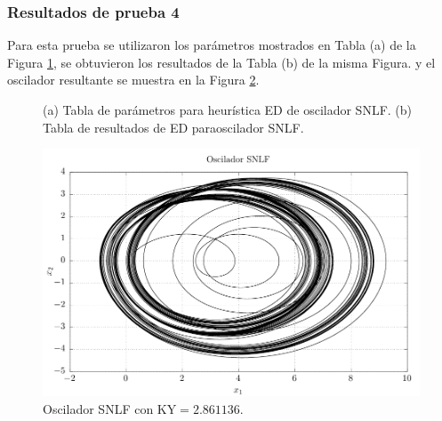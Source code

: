 \documentclass[10pt,a4paper]{article}
\begin{document}
\subsubsection{Resultados de prueba 4}
Para esta prueba se utilizaron los parámetros mostrados en Tabla (a) de la Figura \ref{fig:tabs_res4}, se obtuvieron los resultados de la Tabla (b) de la misma Figura. y el oscilador resultante se muestra en la Figura \ref{fig:res4}.
\begin{figure}[htp]
	\centering
	\hspace{2cm}
	\caption{(a) Tabla de parámetros para heurística ED de oscilador SNLF. (b) Tabla de resultados de ED paraoscilador SNLF.}
	\label{fig:tabs_res4}
\end{figure}


\begin{figure}[htp]
	\centering
	\includegraphics[width=.5\textwidth]{imagenes/super4.pdf}
	\caption{Oscilador SNLF con KY$ = 2.861136$.}
	\label{fig:res4}
\end{figure}
\end{document}
